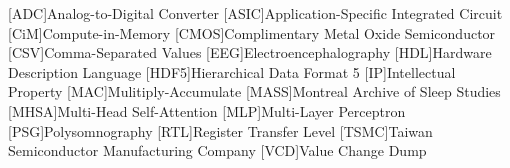 \begin{acronym}
    {\small{}
    [ADC]{Analog-to-Digital Converter}
    [ASIC]{Application-Specific Integrated Circuit}
    [CiM]{Compute-in-Memory}
    [CMOS]{Complimentary Metal Oxide Semiconductor}
    [CSV]{Comma-Separated Values}
    [EEG]{Electroencephalography}
    [HDL]{Hardware Description Language}
    [HDF5]{Hierarchical Data Format 5}
    [IP]{Intellectual Property}
    [MAC]{Mulitiply-Accumulate}
    [MASS]{Montreal Archive of Sleep Studies}
    [MHSA]{Multi-Head Self-Attention}
    [MLP]{Multi-Layer Perceptron}
    [PSG]{Polysomnography}
    [RTL]{Register Transfer Level}
    [TSMC]{Taiwan Semiconductor Manufacturing Company}
    [VCD]{Value Change Dump}
    }
\end{acronym}
